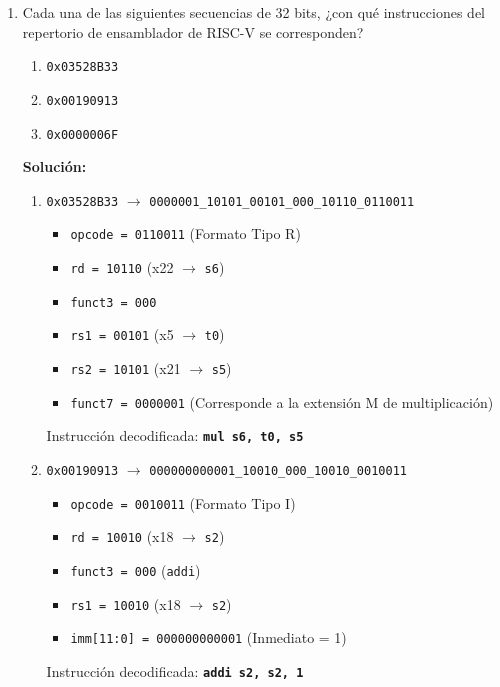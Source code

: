 \documentclass[letterpaper,12pt]{article}
\begin{document}
\begin{enumerate}
    \vspace{0.5cm}

    \item Cada una de las siguientes secuencias de 32 bits, ¿con qué instrucciones del repertorio de ensamblador de RISC-V se corresponden?
    \begin{enumerate}[label=\alph*)]
        \item \texttt{0x03528B33}
        \item \texttt{0x00190913}
        \item \texttt{0x0000006F}
    \end{enumerate}

    \color{solcolor}
    \textbf{Solución:}
    \begin{enumerate}[label=\alph*)]
        \item \texttt{0x03528B33} $\rightarrow$ \texttt{0000001\_10101\_00101\_000\_10110\_0110011}
        \begin{itemize}[noitemsep]
            \item \texttt{opcode = 0110011} (Formato Tipo R)
            \item \texttt{rd = 10110} (x22 $\rightarrow$ \texttt{s6})
            \item \texttt{funct3 = 000}
            \item \texttt{rs1 = 00101} (x5 $\rightarrow$ \texttt{t0})
            \item \texttt{rs2 = 10101} (x21 $\rightarrow$ \texttt{s5})
            \item \texttt{funct7 = 0000001} (Corresponde a la extensión M de multiplicación)
        \end{itemize}
        Instrucción decodificada: \textbf{\texttt{mul s6, t0, s5}}
        
        \item \texttt{0x00190913} $\rightarrow$ \texttt{000000000001\_10010\_000\_10010\_0010011}
        \begin{itemize}[noitemsep]
            \item \texttt{opcode = 0010011} (Formato Tipo I)
            \item \texttt{rd = 10010} (x18 $\rightarrow$ \texttt{s2})
            \item \texttt{funct3 = 000} (\texttt{addi})
            \item \texttt{rs1 = 10010} (x18 $\rightarrow$ \texttt{s2})
            \item \texttt{imm[11:0] = 000000000001} (Inmediato = 1)
        \end{itemize}
        Instrucción decodificada: \textbf{\texttt{addi s2, s2, 1}}
        

\end{enumerate}
\end{enumerate}
\end{document}
